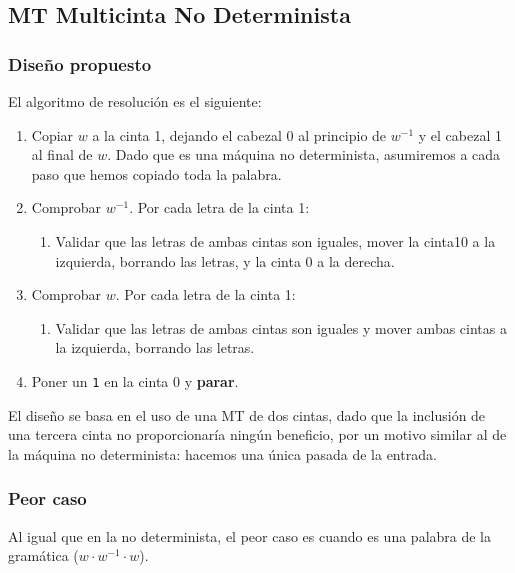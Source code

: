 



\subsection{MT Multicinta No Determinista}

\subsubsection*{Diseño propuesto}
El algoritmo de resolución es el siguiente:

\begin{enumerate}
    \item Copiar $w$ a la cinta 1, dejando el cabezal 0 al principio de $w^{-1}$ y el cabezal 1 al final de $w$. Dado que es una máquina no determinista, asumiremos a cada paso que hemos copiado toda la palabra.
    \item Comprobar $w^{-1}$. Por cada letra de la cinta 1:
    \begin{enumerate}[1.]
        \item Validar que las letras de ambas cintas son iguales, mover la cinta10 a la izquierda, borrando las letras, y la cinta 0 a la derecha.
    \end{enumerate}
    \item Comprobar $w$. Por cada letra de la cinta 1:
    \begin{enumerate}[1.]
        \item Validar que las letras de ambas cintas son iguales y mover ambas cintas a la izquierda, borrando las letras.
    \end{enumerate}
    \item Poner un \texttt{1} en la cinta 0 y \textbf{parar}.
\end{enumerate}


El diseño se basa en el uso de una MT de dos cintas, dado que la inclusión de una tercera cinta no proporcionaría ningún beneficio, por un motivo similar al de la máquina no determinista: hacemos una única pasada de la entrada.

\subsubsection*{Peor caso}
Al igual que en la no determinista, el peor caso es cuando es una palabra de la gramática ($w \cdot w^{-1} \cdot w$).

